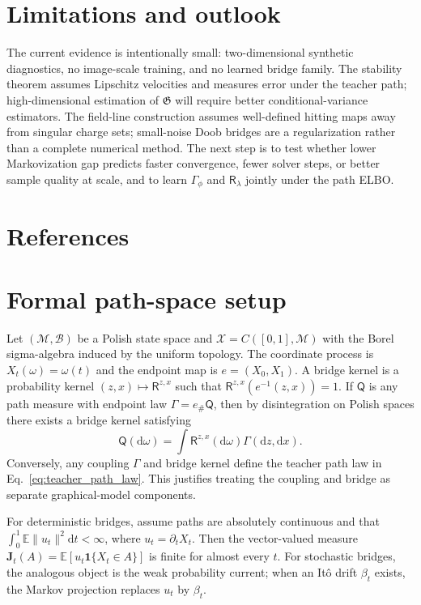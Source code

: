 \documentclass{article}
\numberwithin{equation}{section}
\newcommand{\E}{\mathbb{E}}
\newcommand{\dd}{\mathrm{d}}
\newcommand{\Path}{\mathcal{X}}
\newcommand{\scrR}{\mathsf{R}}
\newcommand{\scrQ}{\mathsf{Q}}
\newcommand{\J}{\bm J}
\begin{document}
\section{Limitations and outlook}
\label{sec:limitations}

The current evidence is intentionally small: two-dimensional synthetic diagnostics, no image-scale training, and no learned bridge family. The stability theorem assumes Lipschitz velocities and measures error under the teacher path; high-dimensional estimation of $\mathfrak G$ will require better conditional-variance estimators. The field-line construction assumes well-defined hitting maps away from singular charge sets; small-noise Doob bridges are a regularization rather than a complete numerical method. The next step is to test whether lower Markovization gap predicts faster convergence, fewer solver steps, or better sample quality at scale, and to learn $\Gamma_\phi$ and $\scrR_\lambda$ jointly under the path ELBO.

\clearpage
\section*{References}
{\small


}


\appendix
\section{Formal path-space setup}
\label{app:setup}

Let $(\mathcal M,\mathcal B)$ be a Polish state space and $\Path=C([0,1],\mathcal M)$ with the Borel sigma-algebra induced by the uniform topology. The coordinate process is $X_t(\omega)=\omega(t)$ and the endpoint map is $e=(X_0,X_1)$. A bridge kernel is a probability kernel $(z,x)\mapsto\scrR^{z,x}$ such that $\scrR^{z,x}(e^{-1}(z,x))=1$. If $\scrQ$ is any path measure with endpoint law $\Gamma=e_\#\scrQ$, then by disintegration on Polish spaces there exists a bridge kernel satisfying
\begin{equation}
    \scrQ(\dd\omega)=\int \scrR^{z,x}(\dd\omega)\Gamma(\dd z,\dd x).
\end{equation}
Conversely, any coupling $\Gamma$ and bridge kernel define the teacher path law in Eq.~\eqref{eq:teacher_path_law}. This justifies treating the coupling and bridge as separate graphical-model components.

For deterministic bridges, assume paths are absolutely continuous and that $\int_0^1\E\|u_t\|^2\dd t<\infty$, where $u_t=\partial_tX_t$. Then the vector-valued measure $\J_t(A)=\E[u_t\mathbf 1\{X_t\in A\}]$ is finite for almost every $t$. For stochastic bridges, the analogous object is the weak probability current; when an It\^o drift $\beta_t$ exists, the Markov projection replaces $u_t$ by $\beta_t$.
\end{document}
